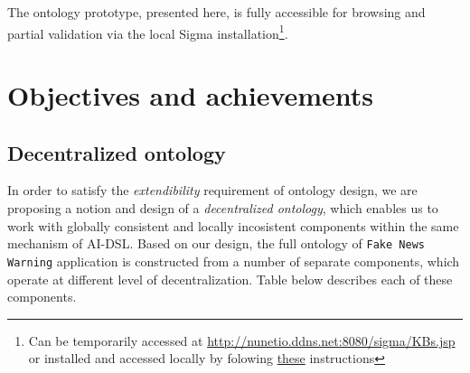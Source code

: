 \documentclass[]{report}
\begin{document}
The ontology prototype, presented here, is fully accessible for browsing and
partial validation via the local Sigma installation\footnote{Can be temporarily
accessed at \href{http://nunetio.ddns.net:8080/sigma/KBs.jsp}
{http://nunetio.ddns.net:8080/sigma/KBs.jsp} or installed and accessed locally
by folowing \href{https://github.com/nunet-io/ai-dsl/blob/master/ontology/tools/README.md}{these} instructions}.

\section{Objectives and achievements}

\subsection{Decentralized ontology}

In order to satisfy the \textit{extendibility} requirement of ontology design,
we are proposing a notion and design of a \textit{decentralized ontology}, which
enables us to work with globally consistent and locally incosistent components
within the same mechanism of AI-DSL. Based on our design, the full ontology of
\texttt{Fake News Warning} application is constructed from a number of separate
components, which operate at different level of decentralization. Table below
describes each of these components.
\end{document}
